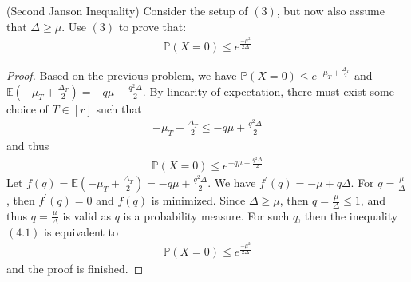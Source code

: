 
\begin{problem}
  (Second Janson Inequality) Consider the setup of $(3)$, but now also assume that $\Delta \geq \mu$. Use $(3)$ to prove that:
  \begin{align*}
    \mathbb{P}(X=0) \leq e^{\frac{-\mu^{2}}{2\Delta}}
  \end{align*}
\end{problem}
\begin{proof}
  Based on the previous problem, we have $\mathbb{P}(X=0) \leq e^{-\mu_{T} + \frac{\Delta_{T}}{2}}$ and $\mathbb{E}(-\mu_{T} + \frac{\Delta_{T}}{2}) = -q\mu + \frac{q^{2}\Delta}{2}$. By linearity of expectation, there must exist some choice of $T \in [r]$ such that
  \begin{align*}
    -\mu_{T} + \frac{\Delta_{T}}{2} \leq -q\mu + \frac{q^{2}\Delta}{2}
  \end{align*}
  and thus
  \begin{align*}
    \mathbb{P}(X=0) \leq e^{-q\mu + \frac{q^{2}\Delta}{2}} \tag{4.1}
  \end{align*}
  Let $f(q) = \mathbb{E}(-\mu_{T} + \frac{\Delta_{T}}{2}) = -q\mu + \frac{q^{2}\Delta}{2}$. We have $f^{'}(q) = -\mu + q\Delta$. For $q = \frac{\mu}{\Delta}$, then $f^{'}(q)=0$ and $f(q)$ is minimized. Since $\Delta \geq \mu$, then $q = \frac{\mu}{\Delta} \leq 1$, and thus $q = \frac{\mu}{\Delta}$ is valid as $q$ is a probability measure. For such $q$, then the inequality $(4.1)$ is equivalent to
  \begin{align*}
    \mathbb{P}(X=0) \leq e^{\frac{-\mu^{2}}{2\Delta}}
  \end{align*}
  and the proof is finished.
\end{proof}
